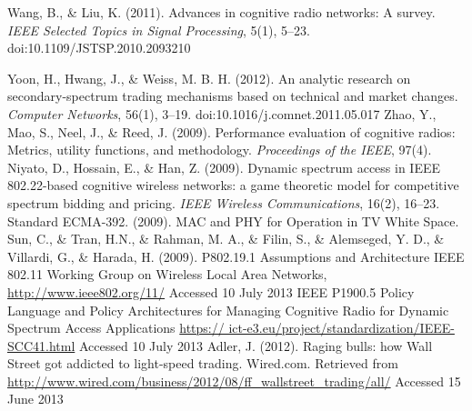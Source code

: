 \begin{thebibliography}{1}
 Wang, B., \& Liu, K. (2011). Advances in cognitive radio networks: A survey. \textit{IEEE Selected Topics in Signal Processing}, 5(1), 5–23. doi:10.1109/JSTSP.2010.2093210

 Yoon, H., Hwang, J., \& Weiss, M. B. H. (2012). An analytic research on secondary-spectrum trading mechanisms based on technical and market changes. \textit{Computer Networks}, 56(1), 3–19. doi:10.1016/j.comnet.2011.05.017
 Zhao, Y., Mao, S., Neel, J., \& Reed, J. (2009). Performance evaluation of cognitive radios: Metrics, utility functions, and methodology. \textit{Proceedings of the IEEE}, 97(4).
 Niyato, D., Hossain, E., \& Han, Z. (2009). Dynamic spectrum access in IEEE 802.22-based cognitive wireless networks: a game theoretic model for competitive spectrum bidding and pricing. \textit{IEEE Wireless Communications}, 16(2), 16–23.
 Standard ECMA-392. (2009). MAC and PHY for Operation in TV White Space.
 Sun, C., \& Tran, H.N., \& Rahman, M. A., \& Filin, S., \& Alemseged, Y. D., \& Villardi, G., \& Harada, H. (2009). P802.19.1 Assumptions and Architecture
 IEEE 802.11 Working Group on Wireless Local Area Networks, \url{http://www.ieee802.org/11/} Accessed 10 July 2013
 IEEE P1900.5 Policy Language and Policy Architectures for Managing Cognitive Radio for Dynamic Spectrum Access Applications \url{https:// ict-e3.eu/project/standardization/IEEE-SCC41.html} Accessed 10 July 2013
 Adler, J. (2012). Raging bulls: how Wall Street got addicted to light-speed trading. Wired.com. Retrieved from \url{http://www.wired.com/business/2012/08/ff_wallstreet_trading/all/} Accessed 15 June 2013


\end{thebibliography}
